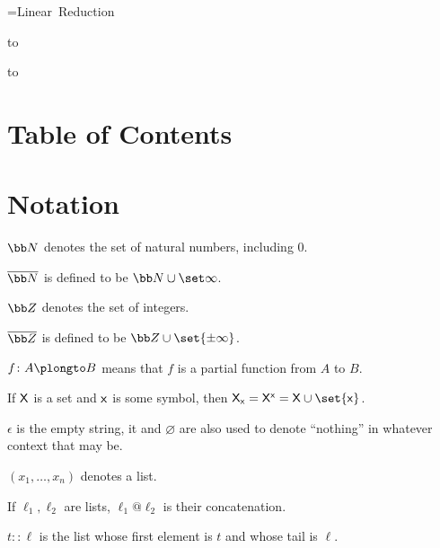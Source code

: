 




{=\hbox{Linear Reduction}
\centerline{
    \vbox{
        \smallskip
        \hbox to
    }
}}

\bigskip
\hbox to

\section*{Table of Contents}

\tableofcontents

\vfill\break

\setcounter{section}{-1}
\section{Notation}

\benum
    \item ${\bb N}$ denotes the set of natural numbers, including $0$.
    \item $\overline{\bb N}$ is defined to be ${\bb N}\cup\set\infty$.
    \item ${\bb Z}$ denotes the set of integers.
    \item $\overline{\bb Z}$ is defined to be ${\bb Z}\cup\set{\pm\infty}$.
    \item $f\colon A\plongto B$ means that $f$ is a partial function from $A$ to $B$.
    \item If ${\sf X}$ is a set and ${\sf x}$ is some symbol, then ${\sf X}_{\sf x}={\sf X}^{\sf x}={\sf X}\cup\set{{\sf x}}$.
    \item $\epsilon$ is the empty string, it and $\varnothing$ are also used to denote ``nothing'' in whatever context that may be.
    \item $(x_1,\dots,x_n)$ denotes a list.
    \item If $\ell_1,\ell_2$ are lists, $\ell_1@\ell_2$ is their concatenation.
    \item $t{::}\ell$ is the list whose first element is $t$ and whose tail is $\ell$.
\eenum
\vfill\break

